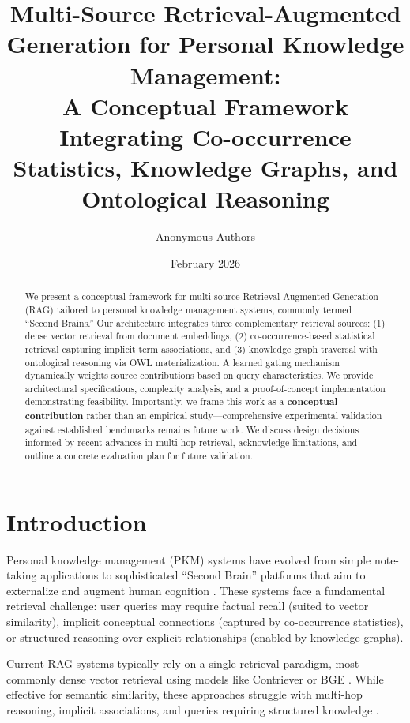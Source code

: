 \documentclass[11pt,a4paper]{article}
\title{Multi-Source Retrieval-Augmented Generation for Personal Knowledge Management: \\
A Conceptual Framework Integrating Co-occurrence Statistics, Knowledge Graphs, and Ontological Reasoning}
\author{Anonymous Authors}
\date{February 2026}
\begin{document}
\maketitle

\begin{abstract}
We present a conceptual framework for multi-source Retrieval-Augmented Generation (RAG) tailored to personal knowledge management systems, commonly termed ``Second Brains.'' Our architecture integrates three complementary retrieval sources: (1) dense vector retrieval from document embeddings, (2) co-occurrence-based statistical retrieval capturing implicit term associations, and (3) knowledge graph traversal with ontological reasoning via OWL materialization. A learned gating mechanism dynamically weights source contributions based on query characteristics. We provide architectural specifications, complexity analysis, and a proof-of-concept implementation demonstrating feasibility. Importantly, we frame this work as a \textbf{conceptual contribution} rather than an empirical study---comprehensive experimental validation against established benchmarks remains future work. We discuss design decisions informed by recent advances in multi-hop retrieval, acknowledge limitations, and outline a concrete evaluation plan for future validation.
\end{abstract}

\section{Introduction}
\label{sec:introduction}

Personal knowledge management (PKM) systems have evolved from simple note-taking applications to sophisticated ``Second Brain'' platforms that aim to externalize and augment human cognition \citep{forte2022building}. These systems face a fundamental retrieval challenge: user queries may require factual recall (suited to vector similarity), implicit conceptual connections (captured by co-occurrence statistics), or structured reasoning over explicit relationships (enabled by knowledge graphs).

Current RAG systems typically rely on a single retrieval paradigm, most commonly dense vector retrieval using models like Contriever \citep{izacard2022unsupervised} or BGE \citep{xiao2023bge}. While effective for semantic similarity, these approaches struggle with multi-hop reasoning, implicit associations, and queries requiring structured knowledge \citep{xiong2021answering}.
\end{document}
